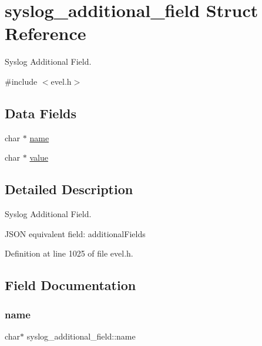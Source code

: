 \hypertarget{structsyslog__additional__field}{}\section{syslog\+\_\+additional\+\_\+field Struct Reference}
\label{structsyslog__additional__field}


Syslog Additional Field.  




{\ttfamily \#include $<$evel.\+h$>$}

\subsection*{Data Fields}
\begin{DoxyCompactItemize}
\item 
char $\ast$ \hyperlink{structsyslog__additional__field_ac441a7f79aa220db6b4e954251f8e488}{name}
\item 
char $\ast$ \hyperlink{structsyslog__additional__field_a82ae1cdc9dc4b8100f55581f7efe6229}{value}
\end{DoxyCompactItemize}


\subsection{Detailed Description}
Syslog Additional Field. 

J\+S\+ON equivalent field\+: additional\+Fields 

Definition at line 1025 of file evel.\+h.



\subsection{Field Documentation}
\hypertarget{structsyslog__additional__field_ac441a7f79aa220db6b4e954251f8e488}{}\label{structsyslog__additional__field_ac441a7f79aa220db6b4e954251f8e488} 
\subsubsection{\texorpdfstring{name}{name}}
{\footnotesize\ttfamily char$\ast$ syslog\+\_\+additional\+\_\+field\+::name}



